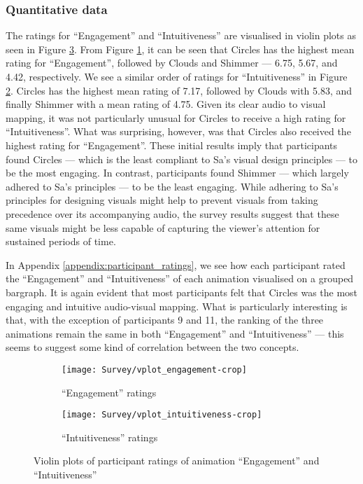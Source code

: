 \documentclass[../initial_thesis.tex]{subfiles}
\begin{document}
\subsubsection{Quantitative data}
The ratings for ``Engagement'' and ``Intuitiveness'' are visualised in violin plots as seen in Figure \ref{fig:vplot_ratings}. From Figure \ref{fig:engagement_ratings}, it can be seen that Circles has the highest mean rating for ``Engagement'', followed by Clouds and Shimmer --- 6.75, 5.67, and 4.42, respectively. We see a similar order of ratings for ``Intuitiveness'' in Figure \ref{fig:intuitive_ratings}. Circles has the highest mean rating of 7.17, followed by Clouds with 5.83, and finally Shimmer with a mean rating of 4.75. Given its clear audio to visual mapping, it was not particularly unusual for Circles to receive a high rating for ``Intuitiveness''. What was surprising, however, was that Circles also received the highest rating for ``Engagement''. These initial results imply that participants found Circles --- which is the least compliant to Sa's visual design principles --- to be the most engaging. In contrast, participants found Shimmer --- which largely adhered to Sa's principles --- to be the least engaging. While adhering to Sa's principles for designing visuals might help to prevent visuals from taking precedence over its accompanying audio, the survey results suggest that these same visuals might be less capable of capturing the viewer's attention for sustained periods of time. \par

In Appendix \ref{appendix:participant_ratings}, we see how each participant rated the ``Engagement'' and ``Intuitiveness'' of each animation visualised on a grouped bargraph. It is again evident that most participants felt that Circles was the most engaging and intuitive audio-visual mapping. What is particularly interesting is that, with the exception of participants 9 and 11, the ranking of the three animations remain the same in both ``Engagement'' and ``Intuitiveness'' --- this seems to suggest some kind of correlation between the two concepts.

\begin{figure}
  \begin{subfigure}{0.5\textwidth}
    \centering
    \texttt{[image: Survey/vplot\_engagement-crop]}
    \caption{``Engagement'' ratings}
    \label{fig:engagement_ratings}
  \end{subfigure}
  \begin{subfigure}{0.5\textwidth}
    \centering
    \texttt{[image: Survey/vplot\_intuitiveness-crop]}
    \caption{``Intuitiveness'' ratings}
    \label{fig:intuitive_ratings}
  \end{subfigure}
  \caption{Violin plots of participant ratings of animation ``Engagement'' and ``Intuitiveness''}
  \label{fig:vplot_ratings}
\end{figure}
\end{document}

